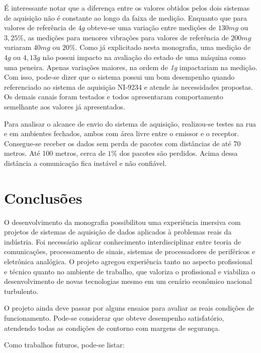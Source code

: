 \documentclass[
	12pt,				%
	openright,			%
	twoside,			%
	a4paper,			%
	english,			%
	french,				%
	spanish,			%
	brazil,				%
	]{abntex2}
\begin{document}
		É interessante notar que a diferença entre os valores obtidos pelos dois sistemas de aquisição não é constante ao longo da faixa de medição. Enquanto que para valores de referência de $4g$ obteve-se uma variação entre medições de $130mg$ ou $3,25\%$, as medições para menores vibrações para valores de referência de $200mg$ variaram $40mg$ ou $20\%$. Como já explicitado nesta monografia, uma medição de $4g$ ou $4,13g$ não possui impacto na avaliação do estado de uma máquina como uma peneira. Apenas variações maiores, na ordem de \textit{1g} impactariam na medição. Com isso, pode-se dizer que o sistema possui um bom desempenho quando referenciado ao sistema de aquisição NI-9234 e atende às necessidades propostas. Os demais canais foram testados e todos apresentaram comportamento semelhante aos valores já apresentados.

		Para analisar o alcance de envio do sistema de aquisição, realizou-se testes na rua e em ambientes fechados, ambos com área livre entre o emissor e o receptor. Consegue-se receber os dados sem perda de pacotes com distâncias de até 70 metros. Até 100 metros, cerca de $1\%$ dos pacotes são perdidos. Acima dessa distância a comunicação fica instável e não confiável.


\chapter{Conclusões}

	O desenvolvimento da monografia possibilitou uma experiência imersiva com
	projetos de sistemas de aquisição de dados aplicados à problemas
	reais da indústria. Foi necessário aplicar conhecimento
	interdisciplinar entre teoria de comunicações, processamento de
	sinais, sistemas de processadores de periféricos e eletrônica
	analógica. O projeto agregou experiência tanto no aspecto
	profissional e técnico quanto no ambiente de trabalho, que valoriza
	o profissional e viabiliza o desenvolvimento de novas tecnologias
	mesmo em um cenário econômico nacional turbulento.

	O projeto ainda deve passar por alguns ensaios para avaliar as reais
	condições de funcionamento. Pode-se considerar que obteve desempenho satisfatório, atendendo
	todas as condições de contorno com margens de segurança.
	
	Como trabalhos futuros, pode-se listar:
	
\end{document}
